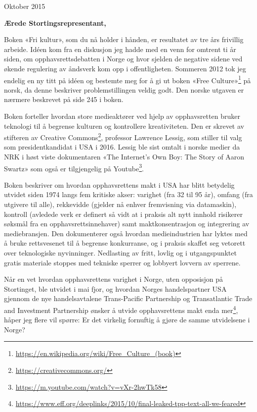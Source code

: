 \documentclass[a4paper, 11pt, norsk]{article}
\begin{document}
\begin{flushright} Oktober 2015 \end{flushright}

{\bf Ærede Stortingsrepresentant,}

Boken «Fri kultur», som du nå holder i hånden, er resultatet av tre
års frivillig arbeide.  Idéen kom fra en diskusjon jeg hadde med en
venn for omtrent ti år siden, om opphavsrettsdebatten i Norge og hvor
sjelden de negative sidene ved økende regulering av åndsverk kom opp i
offentligheten.  Sommeren 2012 tok jeg endelig en ny titt på idéen og
bestemte meg for å gi ut boken «Free
  Culture»\footnote{\url{https://en.wikipedia.org/wiki/Free_Culture_(book)}}
på norsk, da denne beskriver problemstillingen veldig godt.  Den
norske utgaven er nærmere beskrevet på side 245 i boken.

Boken forteller hvordan store medieaktører ved hjelp av opphavsretten
bruker teknologi til å begrense kulturen og kontrollere kreativiteten.
Den er skrevet av stifteren av Creative
Commons\footnote{\url{https://creativecommons.org/}}, professor
Lawrence Lessig, som stiller til valg som presidentkandidat i USA i
2016.  Lessig ble sist omtalt i norske medier da NRK i høst viste
dokumentaren «The Internet's Own Boy: The Story of Aaron Swartz» som
også er tilgjengelig på
Youtube\footnote{\url{https://m.youtube.com/watch?v=vXr-2hwTk58}}.

Boken beskriver om hvordan opphavsrettens makt i USA har blitt
betydelig utvidet siden 1974 langs fem kritiske akser: varighet (fra
32 til 95 år), omfang (fra utgivere til alle), rekkevidde (gjelder nå
enhver fremvisning via datamaskin), kontroll (avledede verk er
definert så vidt at i praksis alt nytt innhold risikerer søksmål fra
en opphavsrettsinnehaver) samt maktkonsentrasjon og integrering av
mediebransjen.  Den dokumenterer også hvordan medieindustrien har
lyktes med å bruke rettsvesenet til å begrense konkurranse, og i
praksis skaffet seg vetorett over teknologiske nyvinninger. Nedlasting
av fritt, lovlig og i utgangspunktet gratis materiale stoppes med
tekniske sperrer og lobbyert lovvern av sperrene.

Når en vet hvordan opphavsrettens varighet i Norge, uten opposisjon på
Stortinget, ble utvidet i mai fjor, og hvordan Norges handelspartner
USA gjennom de nye handelsavtalene Trans-Pacific Partnership og
Transatlantic Trade and Investment Partnership ønsker å utvide
opphavsrettens makt enda
mer\footnote{\url{https://www.eff.org/deeplinks/2015/10/final-leaked-tpp-text-all-we-feared}},
håper jeg flere vil spørre: Er det virkelig fornuftig å gjøre de samme
utvidelsene i Norge?
\end{document}
